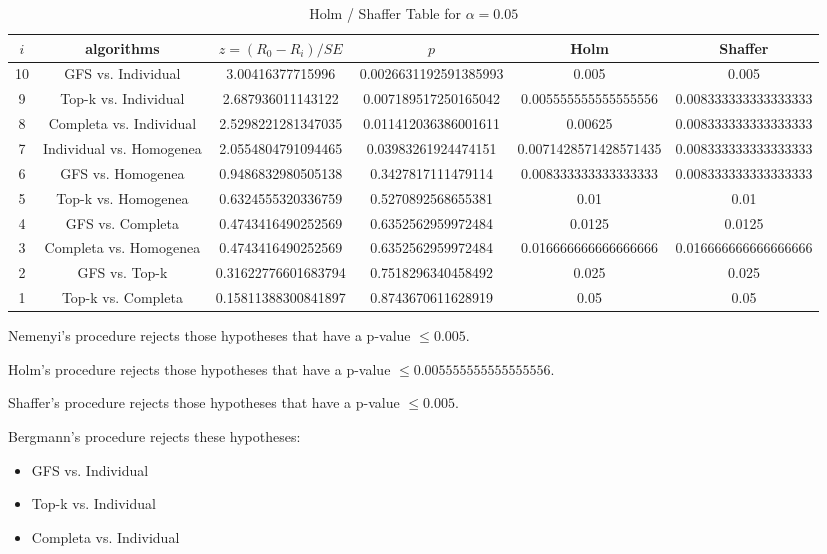 \documentclass[a4paper,10pt]{article}
\begin{document}
\begin{landscape}
\begin{table}[!htp]
\centering\tiny
\caption{Holm / Shaffer Table for $\alpha=0.05$}
\begin{tabular}{cccccc}
$i$&algorithms&$z=(R_0 - R_i)/SE$&$p$&Holm&Shaffer\\
\hline
10&GFS vs. Individual&3.00416377715996&0.0026631192591385993&0.005&0.005\\
9&Top-k vs. Individual&2.687936011143122&0.007189517250165042&0.005555555555555556&0.008333333333333333\\
8&Completa vs. Individual&2.5298221281347035&0.011412036386001611&0.00625&0.008333333333333333\\
7&Individual vs. Homogenea&2.0554804791094465&0.03983261924474151&0.0071428571428571435&0.008333333333333333\\
6&GFS vs. Homogenea&0.9486832980505138&0.3427817111479114&0.008333333333333333&0.008333333333333333\\
5&Top-k vs. Homogenea&0.6324555320336759&0.5270892568655381&0.01&0.01\\
4&GFS vs. Completa&0.4743416490252569&0.6352562959972484&0.0125&0.0125\\
3&Completa vs. Homogenea&0.4743416490252569&0.6352562959972484&0.016666666666666666&0.016666666666666666\\
2&GFS vs. Top-k&0.31622776601683794&0.7518296340458492&0.025&0.025\\
1&Top-k vs. Completa&0.15811388300841897&0.8743670611628919&0.05&0.05\\
\hline
\end{tabular}
\end{table}
Nemenyi's procedure rejects those hypotheses that have a p-value $\le0.005$.


Holm's procedure rejects those hypotheses that have a p-value $\le0.005555555555555556$.


Shaffer's procedure rejects those hypotheses that have a p-value $\le0.005$.


Bergmann's procedure rejects these hypotheses:


\begin{itemize}


\item GFS vs. Individual
\item Top-k vs. Individual
\item Completa vs. Individual
\end{itemize}



\end{landscape}
\end{document}
